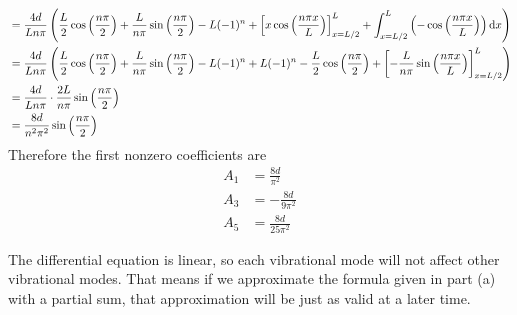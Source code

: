 \documentclass{article}
\begin{document}
\begin{align*}
        &= \frac{4d}{Ln \pi} \left( \frac{L}{2} \cos \left( \frac{n\pi}{2} \right) + \frac{L}{n\pi} \sin \left( \frac{n \pi}{2} \right) - L (-1)^n + \left[ x \cos \left( \frac{n \pi x}{L} \right) \right]_{x=L/2}^L + \int_{x=L/2}^L \left( - \cos \left( \frac{n \pi x}{L} \right) \right) \mathrm{d} x\right)  \\
        &= \frac{4d}{Ln \pi} \left( \frac{L}{2} \cos \left( \frac{n\pi}{2} \right) + \frac{L}{n\pi} \sin \left( \frac{n \pi}{2} \right) - L (-1)^n + L(-1)^n - \frac{L}{2} \cos \left( \frac{n \pi}{2} \right) + \left[- \frac{L}{n\pi} \sin \left( \frac{n \pi x}{L} \right) \right]_{x=L/2}^L \right) \\
        &= \frac{4d}{Ln \pi} \cdot \frac{2L}{n\pi} \sin \left( \frac{n \pi}{2} \right) \\
        &= \frac{8d}{n^2 \pi^2} \sin \left( \frac{n \pi}{2} \right) \\
\end{align*}
Therefore the first nonzero coefficients are
\begin{align*}
    A_1 &= \frac{8d}{\pi^2} \\
    A_3 &= - \frac{8d}{9 \pi^2} \\
    A_5 &= \frac{8d}{25 \pi^2}
\end{align*}

\bigskip
\noindent{}\bigskip\par
The differential equation is linear, so each vibrational mode will not affect other vibrational modes. That means if we approximate the formula given in part (a) with a partial sum, that approximation will be just as valid at a later time.
\end{document}

